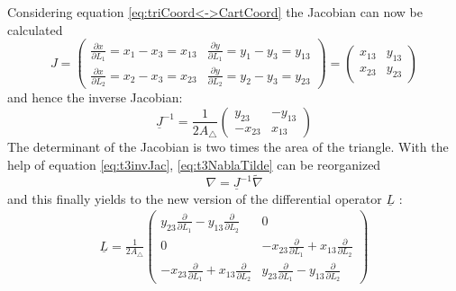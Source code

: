   Considering equation \ref{eq:triCoord<->CartCoord} the Jacobian can now be calculated
  \begin{equation}
  J = \begin{pmatrix}
  \frac{\partial x}{\partial L_1} = x_1-x_3 = x_{13} & \frac{\partial y}{\partial L_1} = y_1-y_3 = y_{13}\\
  \frac{\partial x}{\partial L_2} = x_2-x_3 = x_{23} & \frac{\partial y}{\partial L_2} = y_2-y_3 = y_{23}
  \end{pmatrix} = \begin{pmatrix}
  x_{13} & y_{13}\\
  x_{23} & y_{23}
  \end{pmatrix}
  \end{equation}
  and hence the inverse Jacobian:
  \begin{equation}\label{eq:t3invJac}
  \underline{J}^{-1} = \frac{1}{2 A_\triangle} \begin{pmatrix}
  y_{23} & -y_{13}\\
  -x_{23} & x_{13}
  \end{pmatrix}
  \end{equation}
  The determinant of the Jacobian is two times the area of the triangle. With the help of equation \ref{eq:t3invJac}, \ref{eq:t3NablaTilde} can be reorganized
  \begin{equation}
  \nabla = \underline{J}^{-1} \tilde{\nabla}
  \end{equation}
  and this finally yields to the new version of the differential operator $\underline{L}$ \cite{steinke2005finite}:
  \begin{align}
  \underline{L} = \frac{1}{2 A_\triangle} \begin{pmatrix}
  y_{23}\frac{\partial}{\partial L_1} - y_{13}\frac{\partial}{\partial L_2} & 0 \\
  0 & -x_{23}\frac{\partial}{\partial L_1} + x_{13}\frac{\partial}{\partial L_2} \\
  -x_{23}\frac{\partial}{\partial L_1} + x_{13}\frac{\partial}{\partial L_2} & y_{23}\frac{\partial}{\partial L_1} - y_{13}\frac{\partial}{\partial L_2}
  \end{pmatrix}
  \end{align}
  
